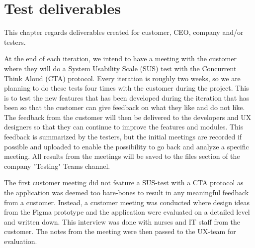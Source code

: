\section{Test deliverables}
This chapter regards deliverables created for customer, CEO, company and/or testers.

\noindent At the end of each iteration, we intend to have a meeting with the customer where they will do a System Usability Scale (SUS) test with the Concurrent Think Aloud (CTA) protocol. Every iteration is roughly two weeks, so we are planning to do these tests four times with the customer during the project. This is to test the new features that has been developed during the iteration that has been so that the customer can give feedback on what they like and do not like. The feedback from the customer will then be delivered to the developers and UX designers so that they can continue to improve the features and modules. This feedback is summarized by the testers, but the initial meetings are recorded if possible and uploaded to enable the possibility to go back and analyze a specific meeting. All results from the meetings will be saved to the files section of the company "Testing" Teams channel. \newline

\noindent The first customer meeting did not feature a SUS-test with a CTA protocol as the application was deemed too bare-bones to result in any meaningful feedback from a customer. Instead, a customer meeting was conducted where design ideas from the Figma prototype and the application were evaluated on a detailed level and written down. This interview was done with nurses and IT staff from the customer. The notes from the meeting were then passed to the UX-team for evaluation.\newline

